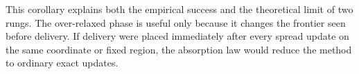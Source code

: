 This corollary explains both the empirical success and the theoretical
limit of two rungs.  The over-relaxed phase is useful only because it changes
the frontier seen before delivery.  If delivery were placed immediately
after every spread update on the same coordinate or fixed region, the
absorption law would reduce the method to ordinary exact updates.
